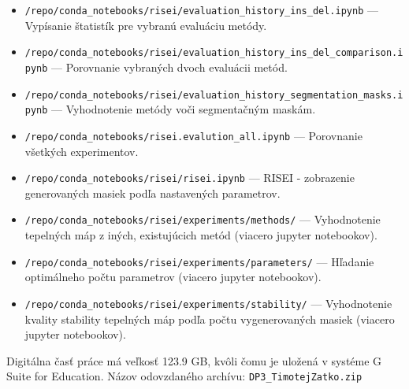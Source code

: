 \begin{itemize}
    \item \texttt{/repo/conda\_notebooks/risei/evaluation\_history\_ins\_del\-.ipynb} --- Vypísanie štatistík pre vybranú evaluáciu metódy.
    \item \texttt{/repo/conda\_notebooks/risei/evaluation\_history\_ins\_del\-\_comparison\-.ipynb} --- Porovnanie vybraných dvoch evaluácii metód.
    \item \texttt{/repo/conda\_notebooks/risei/evaluation\_history\_\-segmentation\-\_masks\-.ipynb} --- Vyhodnotenie metódy voči segmentačným maskám.
    \item \texttt{/repo/conda\_notebooks/risei.evalution\_all.ipynb} --- Porovnanie všetkých experimentov.
    \item \texttt{/repo/conda\_notebooks/risei/risei.ipynb} --- RISEI - zobrazenie generovaných masiek podľa nastavených parametrov.
    \item \texttt{/repo/conda\_notebooks/risei/experiments/methods/} --- Vyhodnotenie tepelných máp z iných, existujúcich metód (viacero jupyter notebookov).
    \item \texttt{/repo/conda\_notebooks/risei/experiments/parameters/} --- Hľadanie optimálneho počtu parametrov (viacero jupyter notebookov).
    \item \texttt{/repo/conda\_notebooks/risei/experiments/stability/} --- Vyhodnotenie kvality stability tepelných máp podľa počtu vygenerovaných masiek (viacero jupyter notebookov).
\end{itemize}

Digitálna časť práce má veľkosť 123.9 GB, kvôli čomu je uložená v systéme G Suite for
Education.
Názov odovzdaného archívu: \texttt{DP3\_TimotejZatko.zip}
